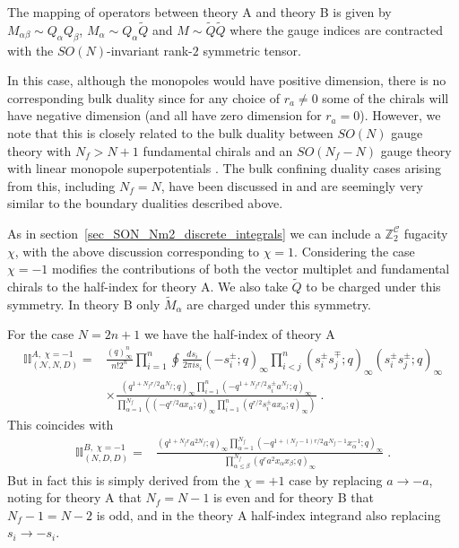 \documentclass[12pt]{article}
\newcommand{\Zb}{\mathbb{Z}}
\newcommand{\Ccal}{\mathcal{C}}
\numberwithin{equation}{section}
\begin{document}
The mapping of operators between theory A and theory B is given by
$M_{\alpha \beta} \sim Q_{\alpha} Q_{\beta}$, $M_{\alpha} \sim Q_{\alpha} \widetilde{Q}$ and $M \sim \widetilde{Q} \widetilde{Q}$ where the gauge indices are contracted with the $SO(N)$-invariant rank-$2$ symmetric tensor. 

In this case, although the monopoles would have positive dimension, there is no corresponding bulk duality since for any choice of $r_a \ne 0$ some of the chirals will have negative dimension (and all have zero dimension for $r_a = 0$). However, we note that this is closely related to the bulk duality between $SO(N)$ gauge theory with $N_f > N + 1$ fundamental chirals and an $SO(N_f - N)$ gauge theory with linear monopole superpotentials \cite{Aharony:2013kma, Amariti:2018gdc}. The bulk confining duality cases arising from this, including $N_f = N$, have been discussed in \cite{Benvenuti:2021nwt} and are seemingly very similar to the boundary dualities described above.

As in section~\ref{sec_SON_Nm2_discrete_integrals} we can include a $\Zb_2^{\Ccal}$ fugacity $\chi$, with the above discussion corresponding to $\chi = 1$. Considering the case $\chi = -1$ modifies the contributions of both the vector multiplet and fundamental chirals to the half-index for theory A. We also take $\widetilde{Q}$ to be charged under this symmetry. In theory B only $\widetilde{M}_{\alpha}$ are charged under this symmetry.

For the case $N = 2n+1$ we have the half-index of theory A
\begin{align}
\mathbb{II}_{(\mathcal{N},N,D)}^{A, \; \chi = -1}
 = &
\frac{(q)_{\infty}^n}{n! 2^n} \prod_{i=1}^n \oint \frac{ds_i}{2\pi i s_i}
(-s_i^{\pm}; q)_{\infty}
\prod_{i < j}^n (s_i^{\pm} s_j^{\mp}; q)_{\infty} (s_i^{\pm} s_j^{\pm}; q)_{\infty}
 \nonumber \\
& \times
\frac{(q^{1+N_fr/2} a^{N_f}; q)_{\infty} \prod_{i = 1}^n (-q^{1+N_fr/2} s_i^{\pm} a^{N_f}; q)_{\infty}}{\prod_{\alpha = 1}^{N_f} \left( (-q^{r/2} a x_{\alpha}; q)_{\infty} \prod_{i = 1}^n (q^{r/2} s_i^{\pm} a x_{\alpha}; q)_{\infty} \right)} \; . 
\end{align}
This coincides with 
\begin{align}
\mathbb{II}_{(N,D,D)}^{B, \; \chi = -1} = &
\frac{(q^{1+N_f r} a^{2N_f}; q)_{\infty} \prod_{\alpha=1}^{N_f} (-q^{1+(N_f - 1)r/2} a^{N_f - 1} x_{\alpha}^{-1}; q)_{\infty}}{\prod_{\alpha \le \beta}^{N_f} (q^r a^2 x_{\alpha} x_{\beta}; q)_{\infty}} \; . 
\end{align}
But in fact this is simply derived from the $\chi = +1$ case by replacing $a \rightarrow -a$, noting for theory A that $N_f = N - 1$ is even and for theory B that $N_f - 1 = N - 2$ is odd, and in the theory A half-index integrand also replacing $s_i \rightarrow -s_i$.
\end{document}
